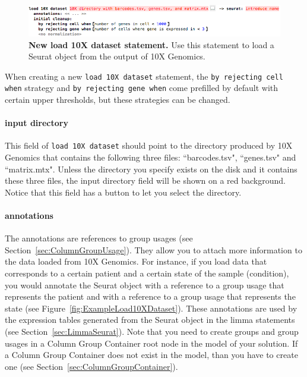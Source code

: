 \begin{figure}[h!tbp]
  \centering
  \includegraphics[width=\figWidthWide]{figures/Load10XDataset.png}
    \caption[New load 10X dataset statement.]{\textbf{New load 10X dataset statement.}
    Use this statement to load a Seurat object from the output of 10X Genomics.}
\label{fig:Load10XDataset}
\end{figure}

When creating a new \texttt{load 10X dataset} statement, the \texttt{by rejecting cell when}
strategy and \texttt{by rejecting gene when} come prefilled by default with certain upper
thresholds, but these strategies can be changed.

\paragraph{input directory} This field of \texttt{load 10X dataset} should point to
the directory produced by 10X Genomics that contains the following three files: ``barcodes.tsv",
``genes.tsv" and ``matrix.mtx". Unless the directory you specify exists on the disk and it contains
these three files, the input directory field will be shown on a red background. Notice that
this field has a button to let you select the directory.

\paragraph{annotations} The annotations are references to group usages (see
Section~\ref{sec:ColumnGroupUsage}). They allow you to attach more information to
the data loaded from 10X Genomics. For instance, if you load data that corresponds
to a certain patient and a certain state of the sample (condition),
you would annotate the Seurat object with a reference to a group usage that represents the
patient and with a reference to a group usage that represents the state (see
Figure~\ref{fig:ExampleLoad10XDataset}).
These annotations are used by the expression tables generated from the Seurat object
in the limma statements (see Section~\ref{sec:LimmaSeurat}). Note that you
need to create groups and group usages in a Column Group Container root node
in the model of your solution. If a Column Group Container does not exist in
the model, than you have to create one (see Section~\ref{sec:ColumnGroupContainer}).

